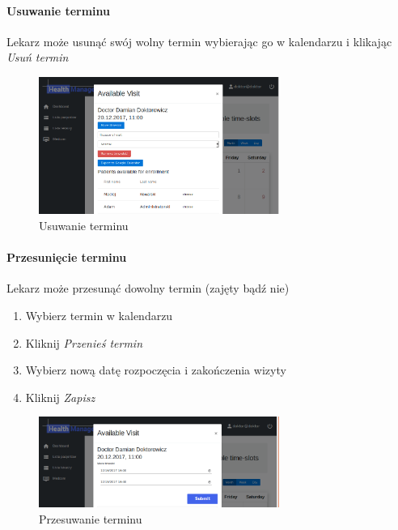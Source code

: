 \documentclass[polish,12pt]{aghthesis}
\begin{document}
    \paragraph{Usuwanie terminu}{
    Lekarz może usunąć swój wolny termin wybierając go w kalendarzu i klikając \emph{Usuń termin}
        \begin{figure}[H]
        \includegraphics[width=0.7\textwidth]{gui-doc-unenrolled}
        \caption{Usuwanie terminu}
        \end{figure}  
    }
    \paragraph{Przesunięcie terminu}{
    Lekarz może przesunąć dowolny termin (zajęty bądź nie)
    \begin{enumerate}
      \item Wybierz termin w kalendarzu
      \item Kliknij \emph{Przenieś termin}
      \item Wybierz nową datę rozpoczęcia i zakończenia wizyty
      \item Kliknij \emph{Zapisz}
    \end{enumerate}
        \begin{figure}[H]
        \includegraphics[width=0.7\textwidth]{gui-doc-moveslot}
        \caption{Przesuwanie terminu}
        \end{figure}  
    }
\end{document}
